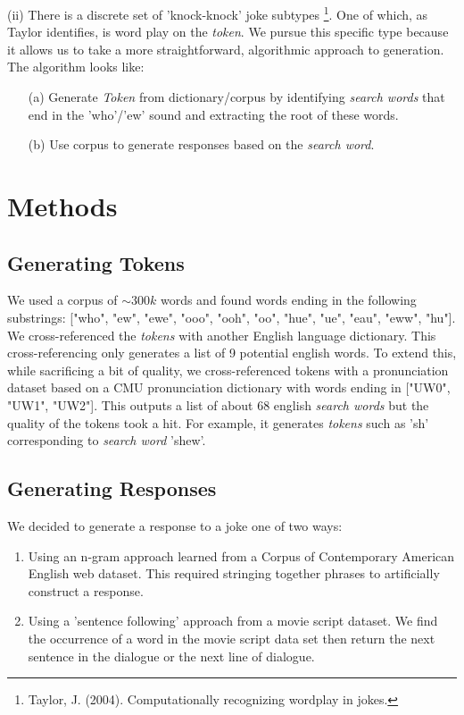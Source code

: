 \documentclass[twoside,twocolumn]{article}
\begin{document}
\noindent (ii) There is a discrete set of 'knock-knock' joke subtypes \footnote{Taylor, J. (2004). Computationally recognizing wordplay in jokes.}.
One of which, as Taylor identifies, is word play on the \emph{token}. We pursue this specific type because it allows us to take a more straightforward, algorithmic approach to generation.
The algorithm looks like:
\begin{center}
    \begin{enumerate}
    \item[(a)] Generate \emph{Token} from dictionary/corpus by identifying \emph{search words} that end in the 'who'/'ew' sound and extracting the root of these words.
    \item[(b)] Use corpus to generate responses based on the \emph{search word}.
    \end{enumerate}
\end{center}



\section{Methods}

\subsection{Generating Tokens}

We used a corpus of $\sim 300k$ words and found words ending in the following substrings: ["who", "ew", "ewe", "ooo", "ooh", "oo", "hue", "ue", "eau", "eww", "hu"].  We cross-referenced the \emph{tokens} with another English language dictionary. This cross-referencing only generates a list of 9 potential english words. To extend this, while sacrificing a bit of quality, we cross-referenced tokens with a pronunciation dataset based on a CMU pronunciation dictionary with words ending in ["UW0", "UW1", "UW2"]. This outputs a list of about 68 english \emph{search words} but the quality of the tokens took a hit. For example, it generates \emph{tokens} such as 'sh' corresponding to \emph{search word} 'shew'. 

\subsection{Generating Responses}
We decided to generate a response to a joke one of two ways:
\begin{enumerate}[label=(\roman*)]
\item Using an n-gram approach learned from a Corpus of Contemporary American English web dataset. This required stringing together phrases to artificially construct a response.
\item Using a 'sentence following' approach from a movie script dataset. We find the occurrence of a word in the movie script data set then return the next sentence in the dialogue or the next line of dialogue.
\end{enumerate}
\end{document}
